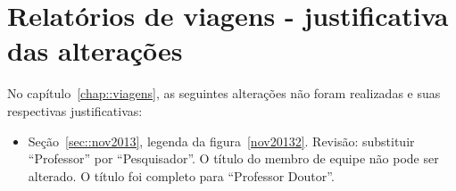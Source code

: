 \section{Relatórios de viagens - justificativa das alterações}

No capítulo~\ref{chap::viagens}, as seguintes alterações não foram realizadas e
suas respectivas justificativas:

\begin{itemize}
  \item Seção~\ref{sec::nov2013}, legenda da figura~\ref{nov20132}. Revisão:
  substituir ``Professor'' por ``Pesquisador''. O título do membro de equipe não
  pode ser alterado. O título foi completo para ``Professor Doutor''.
\end{itemize}
